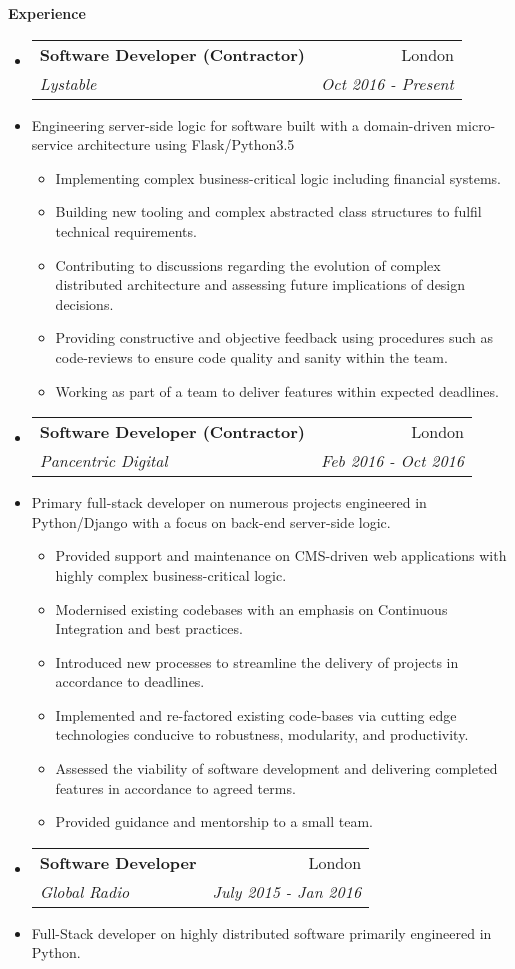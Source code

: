 \documentclass[letterpaper,11pt]{article}
\makeatletter
\newcommand{\resitem}[1]{\item #1 \vspace{-2pt}}
\newcommand{\resheading}[1]{{\large \colorbox{mygrey}
			{\begin{minipage}{\textwidth}
					{\textbf{#1 \vphantom{p\^{E}}}}
		\end{minipage}}}
	}
\newcommand{\ressubheading}[4]{
		\begin{tabular*}{180mm}{l@{\extracolsep{\fill}}r}
			\textbf{#1} & #2 \\
			\textit{#3} & \textit{#4} \\
		\end{tabular*}\vspace{-6pt}
	}
\newcommand{\resdescription}[1]{#1 \vspace{-0mm}}
\makeatother
\begin{document}
	\resheading{Experience}
	\begin{itemize}

		\item[]
            \ressubheading{Software Developer (Contractor)}{London}{Lystable}{Oct 2016 - Present}
		\item[]
			\resdescription{Engineering server-side logic for software built with a domain-driven micro-service architecture using Flask/Python3.5}
			\begin{itemize}
                    \resitem{Implementing complex business-critical logic including financial systems.}
                    \resitem{Building new tooling and complex abstracted class structures to fulfil technical requirements.}
					\resitem{Contributing to discussions regarding the evolution of complex distributed architecture and assessing future implications of design decisions.}
                    \resitem{Providing constructive and objective feedback using procedures such as code-reviews to ensure code quality and sanity within the team.}
					\resitem{Working as part of a team to deliver features within expected deadlines.}
			\end{itemize}
		\item[]
            \ressubheading{Software Developer (Contractor)}{London}{Pancentric Digital}{Feb 2016 - Oct 2016}
		\item[]
			\resdescription{Primary full-stack developer on numerous projects engineered in Python/Django with a focus on back-end server-side logic.}
			\begin{itemize}
                    \resitem{Provided support and maintenance on CMS-driven web applications with highly complex business-critical logic.}
                    \resitem{Modernised existing codebases with an emphasis on Continuous Integration and best practices.}
					\resitem{Introduced new processes to streamline the delivery of projects in accordance to deadlines.}
					\resitem{Implemented and re-factored existing code-bases via cutting edge technologies conducive to robustness, modularity, and productivity.}
					\resitem{Assessed the viability of software development and delivering completed features in accordance to agreed terms.}
					\resitem{Provided guidance and mentorship to a small team.}
			\end{itemize}
		\item[]
			\ressubheading{Software Developer}{London}{Global Radio}{July 2015 - Jan 2016}
		\item[]
			\resdescription{Full-Stack developer on highly distributed software primarily engineered in Python.}

\end{itemize}
\end{document}
